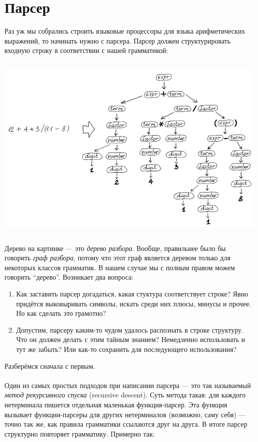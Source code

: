 \documentclass[11pt]{book}
\begin{document}
\section{Парсер}
Раз уж мы собрались строить языковые процессоры для языка арифметических
выражений, то начинать нужно с парсера. Парсер должен структурировать входную
строку в соответствии с нашей грамматикой:
\\ \\
\includegraphics[height=3.5in]{pic/18.png}
\\ \\
Дерево на картинке --- это \emph{дерево разбора}.
Вообще, правильнее было бы говорить \emph{граф разбора}, потому что этот граф является деревом только для некоторых классов грамматик.
В нашем случае мы с полным правом можем говорить ``дерево''.
Возникает два вопроса:
\begin{enumerate}
\item Как заставить парсер догадаться, какая стуктура соответствует строке?
Явно придётся выковыривать символы, искать среди них плюсы, минусы и прочее.
Но как сделать это грамотно?
\item Допустим, парсеру каким-то чудом удалось распознать в строке
структуру. Что он должен делать с этим тайным знанием? Немедленно использовать
и тут же забыть? Или как-то сохранить для последующего использования?
\end{enumerate}
Разберёмся сначала с первым.
\\ \\
Один из самых простых подходов при написании парсера --- это так называемый \emph{метод
рекурсивного спуска} (recursive descent). Суть метода такая: для каждого нетерминала пишется
отдельная маленькая функция-парсер. Эта функция вызывает функции-парсеры для других нетерминалов (возможно, саму себя) ---
точно так же, как правила грамматики ссылаются друг на друга. В итоге
парсер структурно повторяет грамматику. Примерно так:
\end{document}
